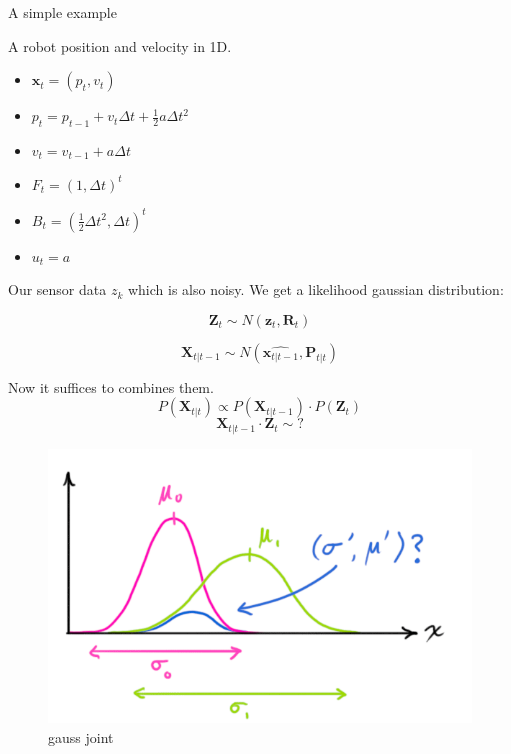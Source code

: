 \begin{frame}{A simple example}

A robot position and velocity in 1D.

\begin{itemize}
\tightlist
\item
  \(\mathbf{x}_t = (p_t, v_t)\)
\item
  \(p_t = p_{t-1} + v_t \Delta t + \frac{1}{2} a \Delta t^2\)
\item
  \(v_t = v_{t-1} + a \Delta t\)
\item
  \(F_t = (1, \Delta t)^t\)
\item
  \(B_t = (\frac{1}{2} \Delta t^2, \Delta t)^t\)
\item
  \(u_t = a\)
\end{itemize}

\end{frame}

\begin{frame}{}

Our sensor data \(z_k\) which is also noisy. We get a likelihood
gaussian distribution:

\[\mathbf{Z}_t \sim N(\mathbf{z}_t, \mathbf{R}_t)\]

\end{frame}

\begin{frame}{}

\[\mathbf{X}_{t|t-1} \sim N(\hat{\mathbf{x}_{t|t-1}}, \mathbf{P}_{t|t})\]

Now it suffices to combines them.
\[P(\mathbf{X}_{t|t}) \propto P(\mathbf{X}_{t|t-1}) \cdot P(\mathbf{Z}_t)\]
\[\mathbf{X}_{t|t-1} \cdot \mathbf{Z}_t \sim ?\]

\begin{figure}
\centering
\includegraphics{gauss_joint.png}
\caption{gauss joint}
\end{figure}

\end{frame}

